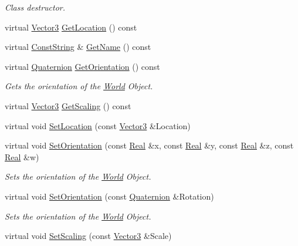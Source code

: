 \begin{DoxyCompactItemize}
\begin{DoxyCompactList}\small\item\em Class destructor. \item\end{DoxyCompactList}\item 
virtual \hyperlink{classMezzanine_1_1Vector3}{Vector3} \hyperlink{classMezzanine_1_1NonStaticWorldObject_aefbebff39e4d21859f5fddb434f6165c}{GetLocation} () const 
\item 
virtual \hyperlink{namespaceMezzanine_a63cd699ac54b73953f35ec9cfc05e506}{ConstString} \& \hyperlink{classMezzanine_1_1NonStaticWorldObject_acb52c6e1718acb9f17e34bf4b6203304}{GetName} () const 
\item 
virtual \hyperlink{classMezzanine_1_1Quaternion}{Quaternion} \hyperlink{classMezzanine_1_1NonStaticWorldObject_a16243dfa38c5ae15725746f56119cb14}{GetOrientation} () const 
\begin{DoxyCompactList}\small\item\em Gets the orientation of the \hyperlink{classMezzanine_1_1World}{World} Object. \item\end{DoxyCompactList}\item 
virtual \hyperlink{classMezzanine_1_1Vector3}{Vector3} \hyperlink{classMezzanine_1_1NonStaticWorldObject_a309577416e71ab3b290c575e9877ca4b}{GetScaling} () const 
\item 
virtual void \hyperlink{classMezzanine_1_1NonStaticWorldObject_ab80106c2fec881169184eff5165e73b6}{SetLocation} (const \hyperlink{classMezzanine_1_1Vector3}{Vector3} \&Location)
\item 
virtual void \hyperlink{classMezzanine_1_1NonStaticWorldObject_a631cdb3e974990ccd9254b171f52ecb8}{SetOrientation} (const \hyperlink{namespaceMezzanine_a726731b1a7df72bf3583e4a97282c6f6}{Real} \&x, const \hyperlink{namespaceMezzanine_a726731b1a7df72bf3583e4a97282c6f6}{Real} \&y, const \hyperlink{namespaceMezzanine_a726731b1a7df72bf3583e4a97282c6f6}{Real} \&z, const \hyperlink{namespaceMezzanine_a726731b1a7df72bf3583e4a97282c6f6}{Real} \&w)
\begin{DoxyCompactList}\small\item\em Sets the orientation of the \hyperlink{classMezzanine_1_1World}{World} Object. \item\end{DoxyCompactList}\item 
virtual void \hyperlink{classMezzanine_1_1NonStaticWorldObject_a9183791c3e61b701b152e245786a63a5}{SetOrientation} (const \hyperlink{classMezzanine_1_1Quaternion}{Quaternion} \&Rotation)
\begin{DoxyCompactList}\small\item\em Sets the orientation of the \hyperlink{classMezzanine_1_1World}{World} Object. \item\end{DoxyCompactList}\item 
virtual void \hyperlink{classMezzanine_1_1NonStaticWorldObject_a03fec7fb4abcd6747695d139d00c7662}{SetScaling} (const \hyperlink{classMezzanine_1_1Vector3}{Vector3} \&Scale)
\end{DoxyCompactItemize}
